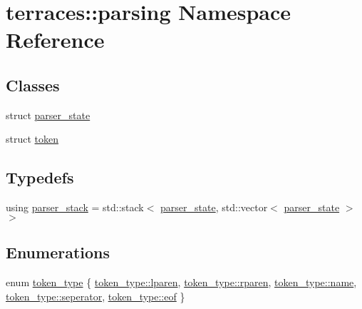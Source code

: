 \hypertarget{namespaceterraces_1_1parsing}{}\section{terraces\+:\+:parsing Namespace Reference}
\label{namespaceterraces_1_1parsing}
\subsection*{Classes}
\begin{DoxyCompactItemize}
\item 
struct \hyperlink{structterraces_1_1parsing_1_1parser__state}{parser\+\_\+state}
\item 
struct \hyperlink{structterraces_1_1parsing_1_1token}{token}
\end{DoxyCompactItemize}
\subsection*{Typedefs}
\begin{DoxyCompactItemize}
\item 
using \hyperlink{namespaceterraces_1_1parsing_a0e70b6a3cbf9868f7c92bbe10a6c4995}{parser\+\_\+stack} = std\+::stack$<$ \hyperlink{structterraces_1_1parsing_1_1parser__state}{parser\+\_\+state}, std\+::vector$<$ \hyperlink{structterraces_1_1parsing_1_1parser__state}{parser\+\_\+state} $>$ $>$
\end{DoxyCompactItemize}
\subsection*{Enumerations}
\begin{DoxyCompactItemize}
\item 
enum \hyperlink{namespaceterraces_1_1parsing_a2d265240dc54342f9462104d7a8392a1}{token\+\_\+type} \{ \newline
\hyperlink{namespaceterraces_1_1parsing_a2d265240dc54342f9462104d7a8392a1a152370721853af95444f2f05ab29d4cc}{token\+\_\+type\+::lparen}, 
\hyperlink{namespaceterraces_1_1parsing_a2d265240dc54342f9462104d7a8392a1aec9962f64dbbc61b566d4d3478a4902a}{token\+\_\+type\+::rparen}, 
\hyperlink{namespaceterraces_1_1parsing_a2d265240dc54342f9462104d7a8392a1ab068931cc450442b63f5b3d276ea4297}{token\+\_\+type\+::name}, 
\hyperlink{namespaceterraces_1_1parsing_a2d265240dc54342f9462104d7a8392a1ae72814aaa963a3fa498930dcf0ed40fb}{token\+\_\+type\+::seperator}, 
\newline
\hyperlink{namespaceterraces_1_1parsing_a2d265240dc54342f9462104d7a8392a1a2e51b1ab42e8a4a67f3445174be5191b}{token\+\_\+type\+::eof}
 \}
\end{DoxyCompactItemize}
